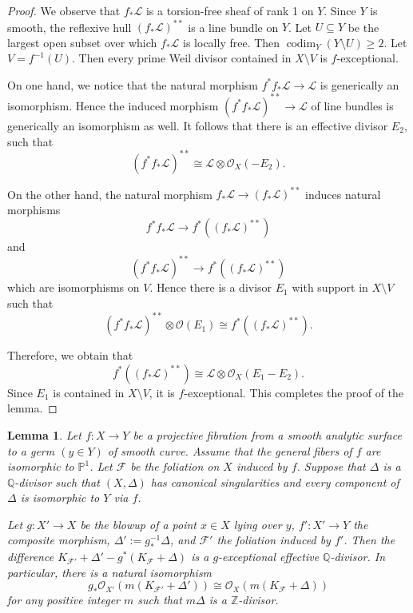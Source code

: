 \documentclass[12pt]{amsart}
\newcommand{\mbZ}{\mathbb{Z}}
\newcommand{\mbQ}{\mathbb{Q}}
\newcommand{\<}{\leq}
\newcommand{\D}{\Delta}
\def\mcO{\mathcal{O}}
\def\mcF{\mathcal{F}}
\def\mcL{\mathcal{L}}
\def\msL{\mathscr{L}}
\newtheorem{lemma}[theorem]{Lemma}
\theoremstyle{remark}
\theoremstyle{definition}
\theoremstyle{definition}
\numberwithin{equation}{section}
\theoremstyle{definition}
\theoremstyle{definition}
\def\codim{\operatorname{codim}}
\begin{document}
\begin{proof}
We observe that $f_*\mcL$ is a torsion-free sheaf of rank 1 on $Y$. 
Since $Y$ is smooth, the reflexive hull $(f_*\msL)^{**}$ is a line bundle on $Y$. 
Let $U\subseteq Y$ be the largest open subset over which $f_*\mcL$ is locally free. 
Then $\codim_Y(Y\setminus U)\geq 2$. 
Let $V=f^{-1}(U)$. 
Then every prime Weil divisor contained in $X\setminus V$ is $f$-exceptional. 

On one hand, we notice that the natural morphism $f^*f_*\mcL \to \mcL$   is generically an isomorphism.  
Hence the induced  morphism $(f^*f_*\mcL)^{**} \to \mcL$ of line bundles is  generically an isomorphism as well.
It follows that there is an effective divisor $E_2$, such that 
\[
(f^*f_*\mcL)^{**} \cong \mcL\otimes \mcO_X(-E_2). 
\]


On the other hand, the natural morphism $f_*\mcL \to (f_*\mcL)^{**}$ induces natural  morphisms
\[
f^*f_*\mcL \to f^*((f_*\mcL)^{**}) 
\]
and 
\[
(f^*f_*\mcL)^{**} \to f^*((f_*\mcL)^{**}) 
\]
which are isomorphisms on $V$. 
Hence there is a divisor $E_1$ with support in $X\setminus V$ such that 
\[
(f^*f_*\mcL)^{**} \otimes \mcO(E_1) \cong f^*((f_*\mcL)^{**}). 
\]

Therefore, we obtain that 
\[
f^*((f_*\mcL)^{**}) \cong \mcL\otimes \mcO_X(E_1-E_2). 
\]
Since $E_1$ is contained in $X\setminus V$, it is $f$-exceptional. 
This completes the proof of the lemma.  
\end{proof} 



\begin{lemma}
\label{lem-blowup-more-adjoint-foliation}
Let $f\colon X\to Y$ be a projective fibration from a  smooth analytic surface to a germ $(y\in Y)$ of smooth curve. 
Assume that the general fibers of $f$ are isomorphic to $\mathbb{P}^1$. 
Let $\mcF$ be the foliation on $X$ induced by $f$.  
Suppose  that $\D$ is a  $\mbQ$-divisor such that $(X, \Delta)$ has canonical singularities and  every component of $\Delta$ is isomorphic to $Y$ \textit{via} $f$.  

Let $g\colon X' \to X$ be the blowup of a point $x  \in X$ lying over $y$, $f'\colon X'\to Y$   the composite morphism, $\Delta':=g^{-1}_*\Delta$, and $\mcF'$   the foliation induced by $f'$. 
Then the difference $K_{\mcF'}+\D' - g^*(K_{\mcF}+\D)$ is a $g$-exceptional effective $\mbQ$-divisor. 
In particular, there is a natural isomorphism 
\[g_*\mathcal{O}_{X'}(m(K_{\mcF'}+\D')) \cong \mathcal{O}_{X }(m(K_{\mcF} +\D ))\]
for any positive integer $m$ such that $m\D$ is a $\mbZ$-divisor. 
\end{lemma}
\end{document}
